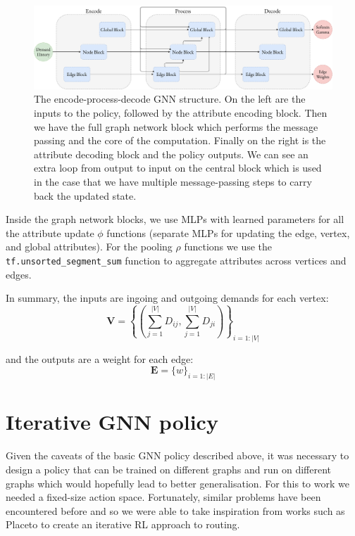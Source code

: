 \begin{figure}
    \centering
    \includegraphics[width=\textwidth]{figures/encode_process_decode.pdf}
    \caption{The encode-process-decode GNN structure. On the left are the inputs to the policy, followed by the attribute encoding block. Then we have the full graph network block which performs the message passing and the core of the computation. Finally on the right is the attribute decoding block and the policy outputs. We can see an extra loop from output to input on the central block which is used in the case that we have multiple message-passing steps to carry back the updated state.}
    \label{fig:encode_process_decode}
\end{figure}

Inside the graph network blocks, we use MLPs with learned parameters for all the attribute update $\phi$ functions (separate MLPs for updating the edge, vertex, and global attributes). For the pooling $\rho$ functions we use the \texttt{tf.unsorted\_segment\_sum} function to aggregate attributes across vertices and edges.

In summary, the inputs are ingoing and outgoing demands for each vertex:
\begin{equation}
  \label{equation:node_inputs}
  \bm{V} = \left\{\left(\sum_{j=1}^{|V|}{D_{ij}}, \sum_{j=1}^{|V|}{D_{ji}}\right)\right\}_{i=1:|V|}
\end{equation}

and the outputs are a weight for each edge:
\begin{equation}
  \label{equation:edge_outputs}
  \bm{E} = \{w\}_{i=1:|E|}
\end{equation}


\section{Iterative GNN policy}
\label{section:gnn_iterative}
Given the caveats of the basic GNN policy described above, it was necessary to design a policy that can be trained on different graphs and run on different graphs which would hopefully lead to better generalisation. For this to work we needed a fixed-size action space. Fortunately, similar problems have been encountered before and so we were able to take inspiration from works such as Placeto\cite{venkatakrishnan2019learning} to create an iterative RL approach to routing.

